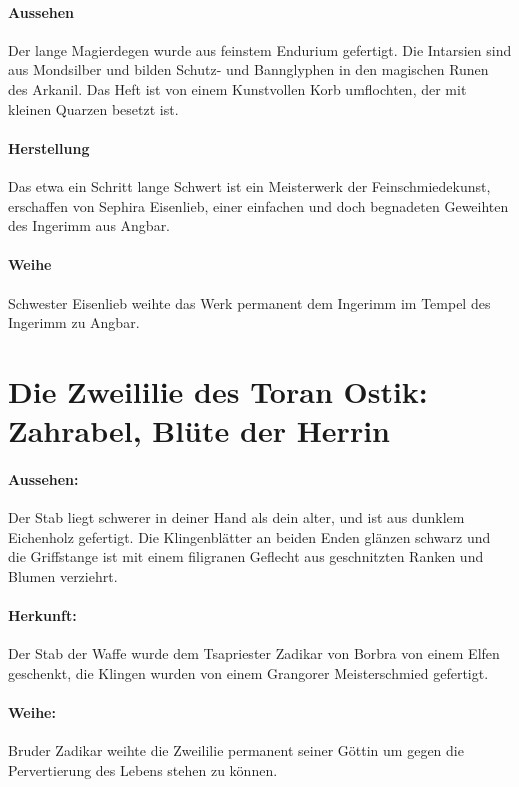 \paragraph{Aussehen}
Der lange Magierdegen wurde aus feinstem Endurium gefertigt. Die Intarsien sind aus Mondsilber und bilden Schutz- und Bannglyphen in den magischen Runen des Arkanil. Das Heft ist von einem Kunstvollen Korb umflochten, der mit kleinen Quarzen besetzt ist.

\paragraph{Herstellung}
Das etwa ein Schritt lange Schwert ist ein Meisterwerk der Feinschmiedekunst, erschaffen von Sephira Eisenlieb, einer einfachen und doch begnadeten Geweihten des Ingerimm aus Angbar. 

\paragraph{Weihe}
Schwester Eisenlieb weihte das Werk permanent dem Ingerimm im Tempel des Ingerimm zu Angbar.


\section{Die Zweililie des Toran Ostik: Zahrabel, Blüte der Herrin}

\paragraph{Aussehen:}
Der Stab liegt schwerer in deiner Hand als dein alter, und ist aus dunklem Eichenholz gefertigt. Die Klingenblätter an beiden Enden glänzen schwarz und die Griffstange ist mit einem filigranen Geflecht aus geschnitzten Ranken und Blumen verziehrt. 

\paragraph{Herkunft:}
Der Stab der Waffe wurde dem Tsapriester Zadikar von Borbra von einem Elfen geschenkt, die Klingen wurden von einem Grangorer Meisterschmied gefertigt.

\paragraph{Weihe:}
Bruder Zadikar weihte die Zweililie permanent seiner Göttin um gegen die Pervertierung des Lebens stehen zu können.

